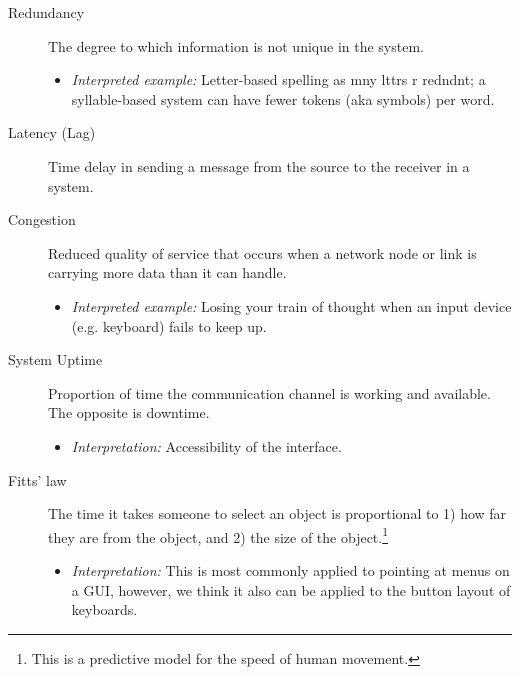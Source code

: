 \documentclass[logo,bsc,singlespacing,parskip]{infthesis}
\begin{document}
{\begin{mdframed}
\begin{description}
\item[{Redundancy}] The degree to which information is not unique in the system.
\begin{itemize}
\item \emph{Interpreted example:} Letter-based spelling as mny lttrs r redndnt; a syllable-based system can have fewer tokens (aka symbols) per word.
\end{itemize}
\end{description}
\end{mdframed}

\begin{mdframed}
\begin{description}
\item[{Latency (Lag)}] Time delay in sending a message from the source to the receiver in a system.
\end{description}
\end{mdframed}

\begin{mdframed}
\begin{description}
\item[{\label{org99cfbfd}Congestion}] Reduced quality of service that occurs when a network node or link is carrying more data than it can handle.
\begin{itemize}
\item \emph{Interpreted example:} Losing your train of thought when an input device (e.g. keyboard) fails to keep up.
\end{itemize}
\end{description}
\end{mdframed}

\begin{mdframed}
\begin{description}
\item[{\label{org1125b77}System Uptime}] Proportion of time the communication channel is working and available. 
The opposite is downtime.
\begin{itemize}
\item \emph{Interpretation:} Accessibility of the interface.
\end{itemize}
\end{description}
\end{mdframed}

\begin{mdframed}
\begin{description}
\item[{Fitts' law}] The time it takes someone to select an object is proportional to 1) how far they are from the object, and 2) the size of the object.\footnote{This is a predictive model for the speed of human movement.}
\begin{itemize}
\item \emph{Interpretation:} This is most commonly applied to pointing at menus on a GUI, however, we think it also can be applied to the button layout of keyboards.
\end{itemize}
\end{description}
\end{mdframed}

}
\end{document}
